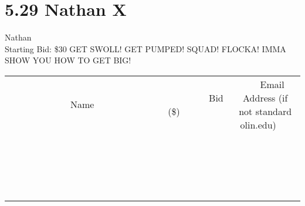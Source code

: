 \documentclass[11pt]{article}
\begin{document}
\section*{5.29 Nathan X}
Nathan
\\
Starting Bid: \$30
\newline
GET SWOLL! GET PUMPED! SQUAD! FLOCKA! IMMA SHOW YOU HOW TO GET BIG!
\\[3ex]
\begin{tabular}{c c c}
~~~~~~~~~~~~~Name~~~~~~~~~~~~~ & ~~~~~~~~~Bid (\$)~~~~~~~~~  & ~~~Email Address (if not standard olin.edu)~~~\\
 & & \\
\hline
 & & \\
\hline
 & & \\
\hline
 & & \\
\hline
 & & \\
\hline
 & & \\
\hline
 & & \\
\hline
 & & \\
\hline
 & & \\
\hline
 & & \\
\hline
 & & \\
\hline
 & & \\
\hline
 & & \\
\hline
 & & \\
\hline
 & & \\
\hline
 & & \\
\hline
 & & \\
\hline
 & & \\
\hline
 & & \\
\hline
\end{tabular}
\newpage
\end{document}
